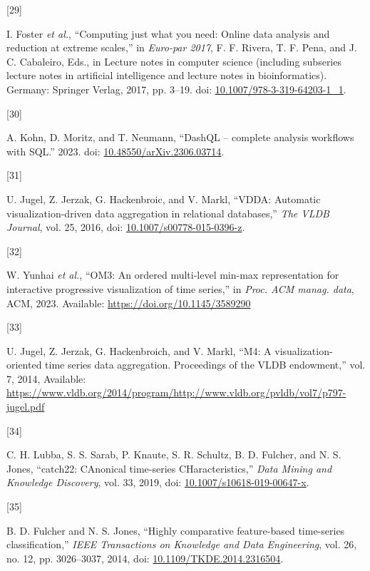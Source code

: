 \documentclass{article}
\newlength{\cslhangindent}
\newlength{\csllabelwidth}
\newlength{\cslentryspacingunit} %
\newenvironment{CSLReferences}[2] %
 {%
  \setlength{\parindent}{0pt}
  \ifodd #1
  \let\oldpar\par
  \def\par{\hangindent=\cslhangindent\oldpar}
  \fi
  \setlength{\parskip}{#2\cslentryspacingunit}
 }%
 {}
\newcommand{\CSLLeftMargin}[1]{\parbox[t]{\csllabelwidth}{#1}}
\newcommand{\CSLRightInline}[1]{\parbox[t]{\linewidth - \csllabelwidth}{#1}\break}
\begin{document}
\begin{CSLReferences}{0}{0}
\leavevmode{}%
\CSLLeftMargin{{[}29{]} }
\CSLRightInline{I. Foster \emph{et al.}, {``Computing just what you
need: Online data analysis and reduction at extreme scales,''} in
\emph{Euro-par 2017}, F. F. Rivera, T. F. Pena, and J. C. Cabaleiro,
Eds., in Lecture notes in computer science (including subseries lecture
notes in artificial intelligence and lecture notes in bioinformatics).
Germany: Springer Verlag, 2017, pp. 3--19. doi:
\href{https://doi.org/10.1007/978-3-319-64203-1_1}{10.1007/978-3-319-64203-1\_1}.}

\leavevmode{}%
\CSLLeftMargin{{[}30{]} }
\CSLRightInline{A. Kohn, D. Moritz, and T. Neumann, {``DashQL --
complete analysis workflows with SQL.''} 2023. doi:
\href{https://doi.org/10.48550/arXiv.2306.03714}{10.48550/arXiv.2306.03714}.}

\leavevmode{}%
\CSLLeftMargin{{[}31{]} }
\CSLRightInline{U. Jugel, Z. Jerzak, G. Hackenbroic, and V. Markl,
{``VDDA: Automatic visualization-driven data aggregation in relational
databases,''} \emph{The VLDB Journal}, vol. 25, 2016, doi:
\href{https://doi.org/10.1007/s00778-015-0396-z}{10.1007/s00778-015-0396-z}.}

\leavevmode{}%
\CSLLeftMargin{{[}32{]} }
\CSLRightInline{W. Yunhai \emph{et al.}, {``OM3: An ordered multi-level
min-max representation for interactive progressive visualization of time
series,''} in \emph{Proc. ACM manag. data}, ACM, 2023. Available:
\url{https://doi.org/10.1145/3589290}}

\leavevmode{}%
\CSLLeftMargin{{[}33{]} }
\CSLRightInline{U. Jugel, Z. Jerzak, G. Hackenbroich, and V. Markl,
{``M4: A visualization-oriented time series data aggregation.
Proceedings of the VLDB endowment,''} vol. 7, 2014, Available:
\url{https://www.vldb.org/2014/program/http://www.vldb.org/pvldb/vol7/p797-jugel.pdf}}

\leavevmode{}%
\CSLLeftMargin{{[}34{]} }
\CSLRightInline{C. H. Lubba, S. S. Sarab, P. Knaute, S. R. Schultz, B.
D. Fulcher, and N. S. Jones, {``catch22: CAnonical time-series
CHaracteristics,''} \emph{Data Mining and Knowledge Discovery}, vol. 33,
2019, doi:
\href{https://doi.org/10.1007/s10618-019-00647-x}{10.1007/s10618-019-00647-x}.}

\leavevmode{}%
\CSLLeftMargin{{[}35{]} }
\CSLRightInline{B. D. Fulcher and N. S. Jones, {``Highly comparative
feature-based time-series classification,''} \emph{IEEE Transactions on
Knowledge and Data Engineering}, vol. 26, no. 12, pp. 3026--3037, 2014,
doi:
\href{https://doi.org/10.1109/TKDE.2014.2316504}{10.1109/TKDE.2014.2316504}.}


\end{CSLReferences}
\end{document}
